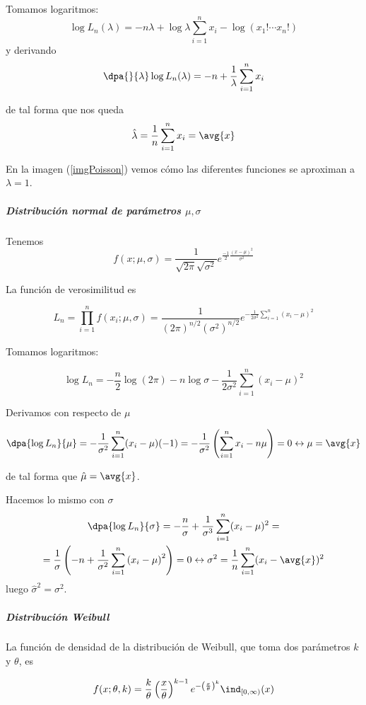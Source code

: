 \documentclass{apuntes}
\begin{document}
Tomamos logaritmos:
\[
\log L_n(\lambda) =
-n\lambda + \log\lambda \sum_{i=1}^n x_i- \log\left(x_1!\dotsb x_n!\right)
\]
y derivando
\[
\dpa{}{\lambda}\log L_n(\lambda) =
-n +\frac{1}{\lambda} \sum_{i=1}^n x_i
\]

de tal forma que nos queda \[ \hat{\lambda} = \frac{1}{n}\sum\limits_{i=1}^n x_i = \avg{x} \]

En la imagen (\ref{imgPoisson}) vemos cómo las diferentes funciones se aproximan a $\lambda = 1$.


\subparagraph{Distribución normal de parámetros $\mu,\sigma$} Tenemos \[f(x;\mu,\sigma) = \frac{1}{\sqrt{2\pi}\sqrt{\sigma^2}}e^{\frac{-1}{2}\frac{(x-\mu)^2}{\sigma^2}} \]

\newpage
La función de verosimilitud es

\[ L_n = \prod_{i=1}^n f(x_i;\mu,\sigma) = \frac{1}{(2\pi)^{n/2} (\sigma^2)^{n/2}} e^{-\frac{1}{2\sigma^2}\sum\limits_{i=1}^n(x_i-\mu)^2} \]

Tomamos logaritmos:

\[ \log L_n = - \frac{n}{2}\log (2\pi) - n \log \sigma - \frac{1}{2\sigma^2} \sum_{i=1}^n(x_i-\mu)^2 \]

Derivamos con respecto de $\mu$

\[
\dpa{\log L_n}{\mu} =
- \frac{1}{\sigma^2} \sum_{i=1}^n(x_i-\mu)(-1) =
- \frac{1}{\sigma^2}\left( \sum_{i=1}^nx_i - n\mu\right) = 0 \leftrightarrow
\mu = \avg{x}
\]

de tal forma que $\hat{\mu} = \avg{x}$.

Hacemos lo mismo con $\sigma$
\begin{gather*}
\dpa{\log L_n}{\sigma} =
- \frac{n}{\sigma} + \frac{1}{\sigma^3} \sum_{i=1}^n(x_i-\mu)^2 =\\
= \frac{1}{\sigma}\left(-n + \frac{1}{\sigma^2} \sum_{i=1}^n\left(x_i-\mu\right)^2\right) = 0 \leftrightarrow
\sigma^2 = \frac{1}{n}\sum_{i=1}^n(x_i-\avg{x})^2
\end{gather*}
luego $\hat{\sigma}^2 = \sigma^2$.

\subparagraph{Distribución Weibull} La función de densidad de la distribución de Weibull, que toma dos parámetros $k$ y $\theta$, es

\[
f(x; \theta, k) =
\frac{k}{\theta}\left(\frac{x}{\theta}\right)^{k-1} e^{-\left(\frac{x}{\theta}\right)^k}\ind_{[0, \infty)}(x)
\]
\end{document}
